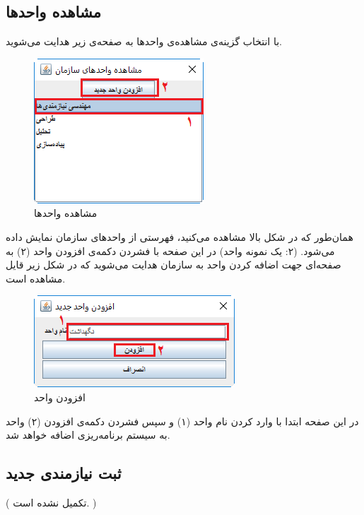 \subsection{مشاهده واحدها}
با انتخاب گزینه‌ی مشاهده‌ی واحدها به صفحه‌ی زیر هدایت می‌شوید.
	\begin{figure}[H]
		\centering
		\includegraphics[scale=0.9]{img/manual/viewUnits}
		\caption{مشاهده واحدها}
	\end{figure}
همان‌طور که در شکل بالا مشاهده می‌کنید، فهرستی از واحدهای سازمان نمایش داده می‌شود. (۲: یک نمونه واحد) در این صفحه با فشردن دکمه‌ی افزودن واحد (۲) به صفحه‌ای جهت اضافه کردن واحد به سازمان هدایت می‌شوید که در شکل زیر قایل مشاهده است.
	\begin{figure}[H]
		\centering
		\includegraphics[scale=0.8]{img/manual/addUnit}
		\caption{افزودن واحد}
	\end{figure}
در این صفحه ابتدا با وارد کردن نام واحد (۱) و سپس فشردن دکمه‌ی افزودن (۲) واحد به سیستم برنامه‌ریزی اضافه خواهد شد.

\subsection{ثبت نیازمندی جدید}
({\color{red} تکمیل نشده است. })


\newpage
